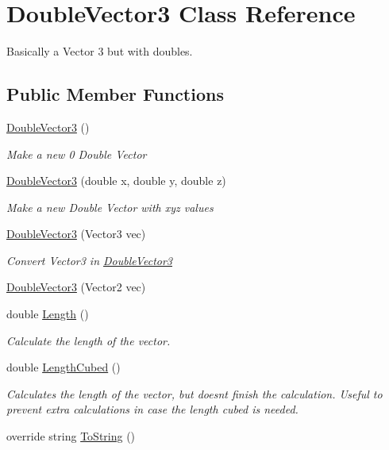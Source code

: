 \hypertarget{class_double_vector3}{}\section{Double\+Vector3 Class Reference}
\label{class_double_vector3}


Basically a Vector 3 but with doubles.  


\subsection*{Public Member Functions}
\begin{DoxyCompactItemize}
\item 
\mbox{\hyperlink{class_double_vector3_a66c77c3c125c29d0210aefee14b55f28}{Double\+Vector3}} ()
\begin{DoxyCompactList}\small\item\em Make a new 0 Double Vector \end{DoxyCompactList}\item 
\mbox{\hyperlink{class_double_vector3_ae23b95b393c10d0d74e9d1244ab02ef6}{Double\+Vector3}} (double x, double y, double z)
\begin{DoxyCompactList}\small\item\em Make a new Double Vector with xyz values \end{DoxyCompactList}\item 
\mbox{\hyperlink{class_double_vector3_a1142dfac687f55169301fec1ecefef7f}{Double\+Vector3}} (Vector3 vec)
\begin{DoxyCompactList}\small\item\em Convert Vector3 in \mbox{\hyperlink{class_double_vector3}{Double\+Vector3}} \end{DoxyCompactList}\item 
\mbox{\hyperlink{class_double_vector3_af5e455ab247ae9bc0e393d04a03495c4}{Double\+Vector3}} (Vector2 vec)
\item 
double \mbox{\hyperlink{class_double_vector3_afc1034f4bff688a4d67ac2d72d7f2e6b}{Length}} ()
\begin{DoxyCompactList}\small\item\em Calculate the length of the vector. \end{DoxyCompactList}\item 
double \mbox{\hyperlink{class_double_vector3_a3856b93c953c7bd5310b8c228c1c2b1e}{Length\+Cubed}} ()
\begin{DoxyCompactList}\small\item\em Calculates the length of the vector, but doesn\textquotesingle{}t finish the calculation. Useful to prevent extra calculations in case the length cubed is needed. \end{DoxyCompactList}\item 
override string \mbox{\hyperlink{class_double_vector3_a3260bcec4bb8444811215005a3f04865}{To\+String}} ()
\end{DoxyCompactItemize}
